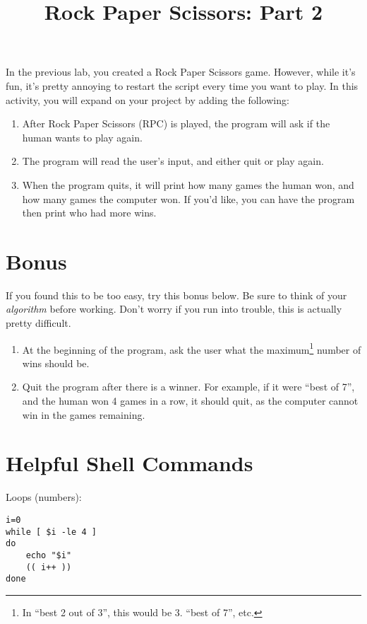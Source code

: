 \documentclass{article}
\title{Rock Paper Scissors: Part 2}
\author{}
\date{}
\begin{document}
\maketitle
\thispagestyle{empty}

In the previous lab, you created a Rock Paper Scissors game. However, while
it's fun, it's pretty annoying to restart the script every time you want to
play. In this activity, you will expand on your project by adding the
following:
\begin{enumerate}
    \item After Rock Paper Scissors (RPC) is played, the program will ask if
        the human wants to play again.

    \item The program will read the user's input, and either quit or play again.

    \item When the program quits, it will print how many games the human won,
        and how many games the computer won. If you'd like, you can have the
        program then print who had more wins.
\end{enumerate}

\section*{Bonus}
If you found this to be too easy, try this bonus below. Be sure to
think of your \textit{algorithm} before working. Don't worry if you run into
trouble, this is actually pretty difficult.
\begin{enumerate}
    \item At the beginning of the program, ask the user what the
        maximum\footnote{In ``best 2 out of 3'', this would be 3. ``best of
        7'', etc.} number of wins should be.

    \item Quit the program after there is a winner. For example, if it were
        ``best of 7'', and the human won 4 games in a row, it should quit, as
        the computer cannot win in the games remaining.
\end{enumerate}

\section*{Helpful Shell Commands}
Loops (numbers):
\begin{lstlisting}
i=0
while [ $i -le 4 ]
do
    echo "$i"
    (( i++ ))
done
\end{lstlisting}
\end{document}
